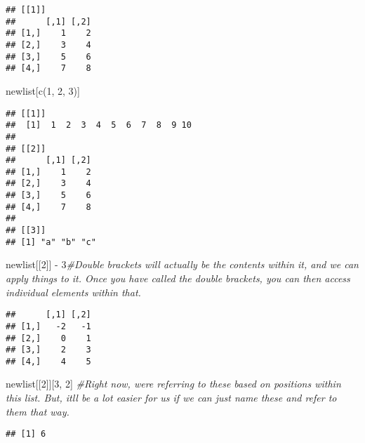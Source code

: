 \documentclass[
]{article}
\newenvironment{Shaded}{\begin{snugshade}}{\end{snugshade}}
\newcommand{\CommentTok}[1]{\textcolor[rgb]{0.56,0.35,0.01}{\textit{#1}}}
\newcommand{\DecValTok}[1]{\textcolor[rgb]{0.00,0.00,0.81}{#1}}
\newcommand{\FunctionTok}[1]{\textcolor[rgb]{0.00,0.00,0.00}{#1}}
\newcommand{\NormalTok}[1]{#1}
\newcommand{\SpecialCharTok}[1]{\textcolor[rgb]{0.00,0.00,0.00}{#1}}
\begin{document}
\begin{verbatim}
## [[1]]
##      [,1] [,2]
## [1,]    1    2
## [2,]    3    4
## [3,]    5    6
## [4,]    7    8
\end{verbatim}

\begin{Shaded}
\begin{Highlighting}[]
\NormalTok{newlist[}\FunctionTok{c}\NormalTok{(}\DecValTok{1}\NormalTok{, }\DecValTok{2}\NormalTok{, }\DecValTok{3}\NormalTok{)]}
\end{Highlighting}
\end{Shaded}

\begin{verbatim}
## [[1]]
##  [1]  1  2  3  4  5  6  7  8  9 10
## 
## [[2]]
##      [,1] [,2]
## [1,]    1    2
## [2,]    3    4
## [3,]    5    6
## [4,]    7    8
## 
## [[3]]
## [1] "a" "b" "c"
\end{verbatim}

\begin{Shaded}
\begin{Highlighting}[]
\NormalTok{newlist[[}\DecValTok{2}\NormalTok{]] }\SpecialCharTok{{-}} \DecValTok{3}\CommentTok{\#Double brackets will actually be the contents within it, and we can apply things to it. Once you have called the double brackets, you can then access individual elements within that.}
\end{Highlighting}
\end{Shaded}

\begin{verbatim}
##      [,1] [,2]
## [1,]   -2   -1
## [2,]    0    1
## [3,]    2    3
## [4,]    4    5
\end{verbatim}

\begin{Shaded}
\begin{Highlighting}[]
\NormalTok{newlist[[}\DecValTok{2}\NormalTok{]][}\DecValTok{3}\NormalTok{, }\DecValTok{2}\NormalTok{] }\CommentTok{\#Right now, we\textquotesingle{}re referring to these based on positions within this list. But, it\textquotesingle{}ll be a lot easier for us if we can just name these and refer to them that way.}
\end{Highlighting}
\end{Shaded}

\begin{verbatim}
## [1] 6
\end{verbatim}
\end{document}
